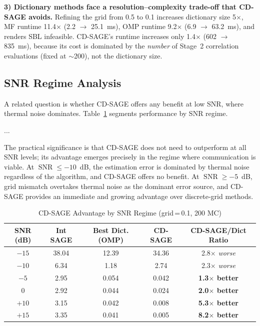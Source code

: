 \documentclass[a4paper,fleqn]{cas-dc}
\DeclareMathOperator{\SNR}{SNR}
\begin{document}
\textbf{3) Dictionary methods face a resolution--complexity trade-off that CD-SAGE avoids.} Refining the grid from 0.5 to 0.1 increases dictionary size 5$\times$, MF runtime 11.4$\times$ (2.2 $\to$ \SI{25.1}{ms}), OMP runtime 9.2$\times$ (6.9 $\to$ \SI{63.2}{ms}), and renders SBL infeasible. CD-SAGE's runtime increases only 1.4$\times$ (602 $\to$ \SI{835}{ms}), because its cost is dominated by the \textit{number} of Stage~2 correlation evaluations (fixed at $\sim$200), not the dictionary size.

\subsection{SNR Regime Analysis}

A related question is whether CD-SAGE offers any benefit at low SNR, where thermal noise dominates. Table~\ref{tab:snr_regime} segments performance by SNR regime.

...

The practical significance is that CD-SAGE does not need to outperform at all SNR levels; its advantage emerges precisely in the regime where communication is viable. At $\SNR \le -10$~dB, the estimation error is dominated by thermal noise regardless of the algorithm, and CD-SAGE offers no benefit. At $\SNR \ge -5$~dB, grid mismatch overtakes thermal noise as the dominant error source, and CD-SAGE provides an immediate and growing advantage over discrete-grid methods.

\begin{table}[cols=5,pos=htbp]
\centering
\caption{CD-SAGE Advantage by SNR Regime (grid$\,$=$\,$0.1, 200 MC)}
\label{tab:snr_regime}
\small
\begin{tabular}{@{}ccccc@{}}
\toprule
SNR (dB) & Int SAGE & Best Dict. (OMP) & CD-SAGE & CD-SAGE/Dict Ratio \\
\midrule
$-15$ & 38.04 & 12.39 & 34.36 & 2.8$\times$ \textit{worse} \\
$-10$ &  6.34 &  1.18 &  2.74 & 2.3$\times$ \textit{worse} \\
$ -5$ &  2.95 &  0.054 & 0.042 & \textbf{1.3$\times$ better} \\
$  0$ &  2.92 &  0.044 & 0.024 & \textbf{2.0$\times$ better} \\
$+10$ &  3.15 &  0.042 & 0.008 & \textbf{5.3$\times$ better} \\
$+15$ &  3.35 &  0.041 & 0.005 & \textbf{8.2$\times$ better} \\
\bottomrule
\end{tabular}
\end{table}
\end{document}
